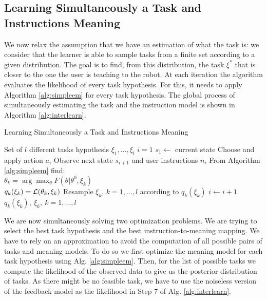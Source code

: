 \subsection{Learning Simultaneously a Task and Instructions Meaning}

We now relax the assumption that we have an estimation of what the task is: we consider that the learner is able to sample tasks from a finite set according to a given distribution. The goal is to find, from this distribution, the task $\xi^*$ that is closer to the one the user is teaching to the robot. At each iteration the algorithm evaluates the likelihood of every task hypothesis. For this, it needs to apply Algorithm \ref{alg:simpleem} for every task hypothesis. The global process of simultaneously estimating the task and the instruction model is shown in Algorithm \ref{alg:interlearn}.

\begin{algorithm}
\caption{Learning Simultaneously a Task and Instructions Meaning}
\begin{algorithmic}[1]
\REQUIRE Set of $l$ different tasks hypothesis $\xi_1,\ldots,\xi_l$
\STATE $i = 1$
\STATE $s_1 \leftarrow$ current state
\WHILE{\TRUE} 
	\STATE Choose and apply action $a_i$
	\STATE Observe next state $s_{i+1}$ and user instructions $n_i$
		\STATE From Algorithm \ref{alg:simpleem} find:\\
		$\theta_k = \arg\max_{\theta} F(\theta|\theta^0, \xi_k)$\\
		$q_k(\xi_k) = \mathcal{L}(\theta_k, \xi_k)$
	\ENDFOR
	\STATE Resample $\xi_k$, $k = 1,\ldots,l$ according to $q_k(\xi_k)$	
	\STATE $i \leftarrow i+1$
\ENDWHILE
\RETURN $q_k(\xi_k),\ \xi_k,\  k = 1,\ldots,l $
\end{algorithmic}
\label{alg:interlearn}
\end{algorithm}

We are now simultaneously solving two optimization problems. We are trying to select the best task hypothesis and the best instruction-to-meaning mapping. We have to rely on an approximation to avoid the computation of all possible pairs of tasks and meaning models. To do so we first optimize the meaning model for each task hypothesis using Alg. \ref{alg:simpleem}. Then, for the list of possible tasks we compute the likelihood of the observed data to give us the posterior distribution of tasks. As there might be no feasible task, we have to use the noiseless version of the feedback model as the likelihood in Step 7 of Alg. \ref{alg:interlearn}.

